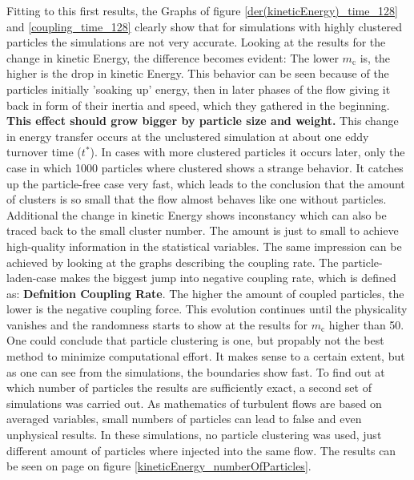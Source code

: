 \documentclass[a4paper,12pt]{article}
\numberwithin{equation}{section} %
\begin{document}
Fitting to this first results, the Graphs of figure \ref{der(kineticEnergy)_time_128} and \ref{coupling_time_128} clearly show that for simulations with highly clustered particles the simulations are not very accurate. Looking at the results for the change in kinetic Energy, the difference becomes evident: The lower $ m_\mathrm{c} $ is, the higher is the drop in kinetic Energy. This behavior can be seen because of the particles initially 'soaking up' energy, then in later phases of the flow giving it back in form of their inertia and speed, which they gathered in the beginning. \textbf{This effect should grow bigger by particle size and weight.} This change in energy transfer occurs at the unclustered simulation at about one eddy turnover time ($t^*$). In cases with more clustered particles it occurs later, only the case in which 1000 particles where clustered shows a strange behavior. It catches up the particle-free case very fast, which leads to the conclusion that the amount of clusters is so small that the flow almost behaves like one without particles. Additional the change in kinetic Energy shows inconstancy which can also be traced back to the small cluster number. The amount is just to small to achieve high-quality information in the statistical variables. 
\newline
The same impression can be achieved by looking at the graphs describing the coupling rate. The particle-laden-case makes the biggest jump into negative coupling rate, which is defined as: \textbf{Defnition Coupling Rate}. The higher the amount of coupled particles, the lower is the negative coupling force. This evolution continues until the physicality vanishes and the randomness starts to show at the results for $m_\mathrm{c}$ higher than 50. 
\newline
One could conclude that particle clustering is one, but propably not the best method to minimize computational effort. It makes sense to a certain extent, but as one can see from the simulations, the boundaries show fast. 
\newline
To find out at which number of particles the results are sufficiently exact, a second set of simulations was carried out. As mathematics of turbulent flows are based on averaged variables, small numbers of particles can lead to false and even unphysical results. In these simulations, no particle clustering was used, just different amount of particles where injected into the same flow. The results can be seen on page \pageref{kineticEnergy_numberOfParticles} on figure \ref{kineticEnergy_numberOfParticles}. 
\end{document}
